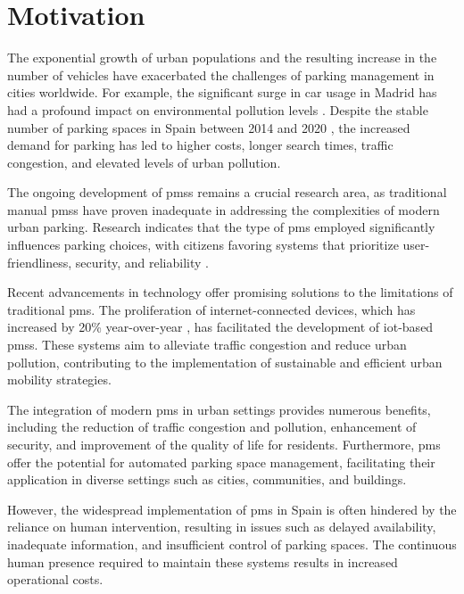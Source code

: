 \chapter{Motivation}\label{ch:motivation}

The exponential growth of urban populations and the resulting increase in the number of vehicles have exacerbated the challenges of parking management in cities worldwide. For example, the significant surge in car usage in Madrid has had a profound impact on environmental pollution levels \autocite{environmental_impact_madrid_central}. Despite the stable number of parking spaces in Spain between 2014 and 2020 \autocite{urban_mobility_trends}, the increased demand for parking has led to higher costs, longer search times, traffic congestion, and elevated levels of urban pollution.

The ongoing development of \glspl{pms} remains a crucial research area, as traditional manual \glspl{pms} have proven inadequate in addressing the complexities of modern urban parking. Research indicates that the type of \gls{pms} employed significantly influences parking choices, with citizens favoring systems that prioritize user-friendliness, security, and reliability \autocite{parking_choices}.

Recent advancements in technology offer promising solutions to the limitations of traditional \gls{pms}. The proliferation of internet-connected devices, which has increased by 20\% year-over-year \autocite{iot_growth}, has facilitated the development of \gls{iot}-based \glspl{pms}. These systems aim to alleviate traffic congestion and reduce urban pollution, contributing to the implementation of sustainable and efficient urban mobility strategies.

The integration of modern \gls{pms} in urban settings provides numerous benefits, including the reduction of traffic congestion and pollution, enhancement of security, and improvement of the quality of life for residents. Furthermore, \gls{pms} offer the potential for automated parking space management, facilitating their application in diverse settings such as cities, communities, and buildings.

However, the widespread implementation of \gls{pms} in Spain is often hindered by the reliance on human intervention, resulting in issues such as delayed availability, inadequate information, and insufficient control of parking spaces. The continuous human presence required to maintain these systems results in increased operational costs.

